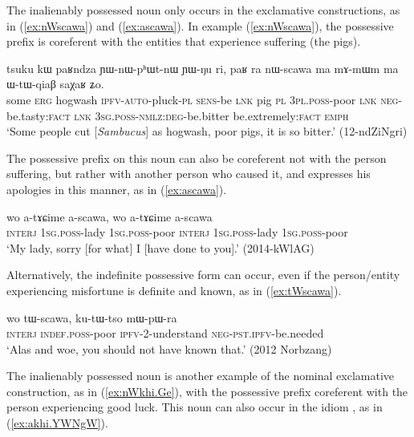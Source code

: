 The inalienably possessed noun  only occurs in the exclamative constructions, as in (\ref{ex:nWscawa}) and (\ref{ex:ascawa}). In example (\ref{ex:nWscawa}), the possessive prefix is coreferent with the entities that experience suffering (the pigs).

\begin{exe}
\ex \label{ex:nWscawa} 
\gll tsuku kɯ paʁndza ɲɯ-nɯ-pʰɯt-nɯ ɲɯ-ŋu ri, paʁ ra nɯ-scawa ma mɤ-mɯm ma ɯ-tɯ-qiaβ saχaʁ ʑo. \\
some \textsc{erg} hogwash \textsc{ipfv}-\textsc{auto}-pluck-\textsc{pl} \textsc{sens}-be \textsc{lnk} pig \textsc{pl} \textsc{3pl}.\textsc{poss}-poor \textsc{lnk} \textsc{neg}-be.tasty:\textsc{fact} \textsc{lnk} \textsc{3sg}.\textsc{poss}-\textsc{nmlz}:\textsc{deg}-be.bitter be.extremely:\textsc{fact} \textsc{emph} \\
\glt `Some people cut [\textit{Sambucus}] as hogwash, poor pigs, it is so bitter.' (12-ndZiNgri)
\end{exe}

The possessive prefix on this noun can also be coreferent not with the person suffering, but rather with another person who caused it, and expresses his apologies in this manner, as in (\ref{ex:ascawa}).

\begin{exe}
\ex \label{ex:ascawa}
\gll wo a-tɤɕime a-scawa, wo a-tɤɕime a-scawa \\
\textsc{interj} \textsc{1sg}.\textsc{poss}-lady \textsc{1sg}.\textsc{poss}-poor \textsc{interj} \textsc{1sg}.\textsc{poss}-lady \textsc{1sg}.\textsc{poss}-poor \\ 
\glt `My lady, sorry [for what] I [have done to you].' (2014-kWlAG)
\end{exe}

Alternatively, the indefinite possessive form  can occur, even if the person/entity experiencing misfortune is definite and known, as in (\ref{ex:tWscawa}).

\begin{exe}
\ex \label{ex:tWscawa}
\gll wo tɯ-scawa, ku-tɯ-tso mɯ-pɯ-ra \\
\textsc{interj} \textsc{indef}.\textsc{poss}-poor \textsc{ipfv}-2-understand \textsc{neg}-\textsc{pst}.\textsc{ipfv}-be.needed \\
\glt `Alas and woe, you should not have known that.' (2012 Norbzang) 
\end{exe}

The inalienably possessed noun  is another example of the nominal exclamative construction, as in (\ref{ex:nWkhi.Ge}), with the possessive prefix coreferent with the person experiencing good luck. This noun can also occur in the idiom , as in (\ref{ex:akhi.YWNgW}).

